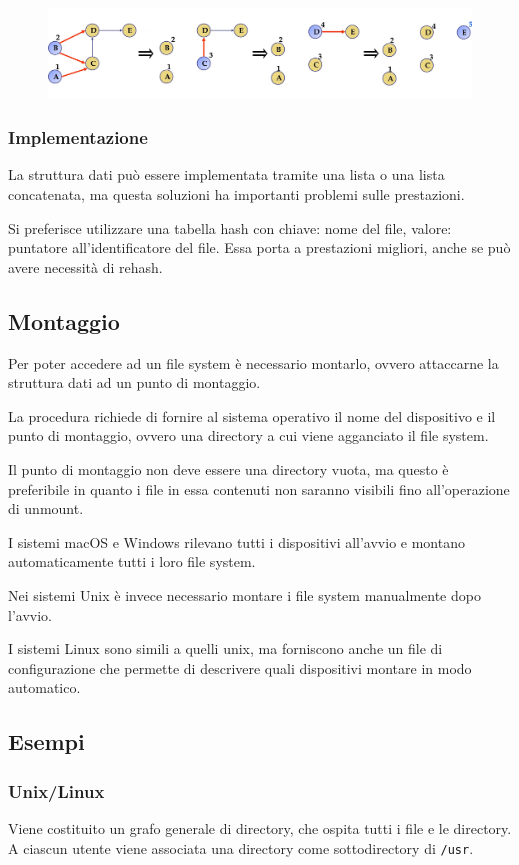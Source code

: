 \begin{figure}[H]
    \centering
    \includegraphics[width=0.75\linewidth]{assets/algoritmo-ordinamento-topologico.jpg}
\end{figure}

\subsubsection*{Implementazione}
La struttura dati può essere implementata tramite una lista o una lista concatenata, ma questa soluzioni ha importanti problemi sulle prestazioni.

Si preferisce utilizzare una tabella hash con chiave: nome del file, valore: puntatore all'identificatore del file. Essa porta a prestazioni migliori, anche se può avere necessità di rehash.

\subsection{Montaggio}
Per poter accedere ad un file system è necessario montarlo, ovvero attaccarne la struttura dati ad un punto di montaggio.

\spacer
La procedura richiede di fornire al sistema operativo il nome del dispositivo e il punto di montaggio, ovvero una directory a cui viene agganciato il file system.

Il punto di montaggio non deve essere una directory vuota, ma questo è preferibile in quanto i file in essa contenuti non saranno visibili fino all'operazione di unmount.

\spacer
I sistemi macOS e Windows rilevano tutti i dispositivi all'avvio e montano automaticamente tutti i loro file system.

Nei sistemi Unix è invece necessario montare i file system manualmente dopo l'avvio.

I sistemi Linux sono simili a quelli unix, ma forniscono anche un file di configurazione che permette di descrivere quali dispositivi montare in modo automatico.

\subsection{Esempi}
\subsubsection{Unix/Linux}
Viene costituito un grafo generale di directory, che ospita tutti i file e le directory.
A ciascun utente viene associata una directory come sottodirectory di \texttt{/usr}.

